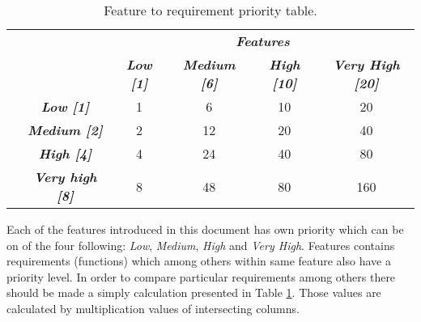\begin{comment}
		All of requirements have one of four priority levels: \emph{Low}, \emph{Medium}, \emph{High} and \emph{Very High}. Tasks should be completed in order of their priority in descending order, where the lowest priority has the lowest number value. The origin of those values come from the testing priority were we can compare impact of the error and likelihood of its occurrence. This dependency can be clearly seen in Table \ref{tab:priority-and-risk-matrix}. Impact in this case can refer to the weight of a certain task, importance of a task among others. The likelihood can be refer to the probability of occurrence of issue in certain feature. 
		content...
	\end{comment}

	\begin{table}[!htbp]
		\centering
		\caption{Feature to requirement priority table.}
		\label{tab:feature-to-requirement-priority-table}
		\begin{tabular}{cc|c|c|c|c|}
			\cline{3-6}
			&  & \multicolumn{4}{c|}{\textit{\textbf{Features}}} \\ \cline{3-6} 
			&  & \textit{\textbf{Low {[}1{]}}} & \textit{\textbf{Medium {[}6{]}}} & \textit{\textbf{High {[}10{]}}} & \textit{\textbf{Very High {[}20{]}}} \\ \hline
			\multicolumn{1}{|c|}{\multirow{4}{*}{\rotatebox[origin=c]{90}{\textit{\textbf{Functions}}}}} & \textit{\textbf{Low {[}1{]}}} & 1 & 6 & 10 & 20 \\ \cline{2-6} 
			\multicolumn{1}{|c|}{} & \textit{\textbf{Medium {[}2{]}}} & 2 & 12 & 20 & 40 \\ \cline{2-6} 
			\multicolumn{1}{|c|}{} & \textit{\textbf{High {[}4{]}}} & 4 & 24 & 40 & 80 \\ \cline{2-6} 
			\multicolumn{1}{|c|}{} & \textit{\textbf{Very high {[}8{]}}} & 8 & 48 & 80 & 160 \\ \hline
		\end{tabular}
	\end{table}

	
	Each of the features introduced in this document has own priority which can be on of the four following: \emph{Low}, \emph{Medium}, \emph{High} and \emph{Very High}. Features contains requirements (functions) which among others within same feature also have a priority level. In order to compare particular requirements among others there should be made a simply calculation presented in Table \ref{tab:feature-to-requirement-priority-table}. Those values are calculated by multiplication values of intersecting columns. 
